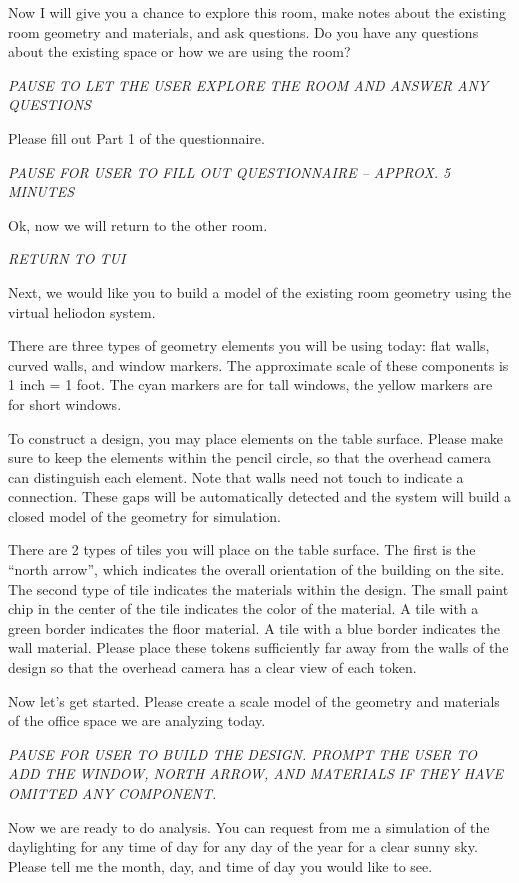 \documentclass[12pt]{article}
\begin{document}
Now I will give you a chance to explore this room, make notes about
the existing room geometry and materials, and ask questions.  Do you
have any questions about the existing space or how we are using the
room?

{\em PAUSE TO LET THE USER EXPLORE THE ROOM AND ANSWER ANY QUESTIONS }

Please fill out Part 1 of the questionnaire.

{\em PAUSE FOR USER TO FILL OUT QUESTIONNAIRE  --  APPROX. 5 MINUTES }

Ok, now we will return to the other room.

{\em RETURN TO TUI }

Next, we would like you to build a model of the existing room
geometry using the virtual heliodon system.  

There are three types of geometry elements you will be using today:
flat walls, curved walls, and window markers.  The approximate scale
of these components is 1 inch = 1 foot.  The cyan markers are for tall
windows, the yellow markers are for short windows.  

To construct a design, you may place elements on the table
surface. Please make sure to keep the elements within the pencil
circle, so that the overhead camera can distinguish each element.
Note that walls need not touch to indicate a connection.  These gaps
will be automatically detected and the system will build a closed
model of the geometry for simulation.

There are 2 types of tiles you will place on the table surface.  The
first is the ``north arrow'', which indicates the overall orientation
of the building on the site.  The second type of tile indicates the
materials within the design.  The small paint chip in the center of
the tile indicates the color of the material.  A tile with a green
border indicates the floor material.  A tile with a blue border
indicates the wall material.  Please place these tokens sufficiently
far away from the walls of the design so that the overhead camera has
a clear view of each token.

Now let's get started.  Please create a scale model of the geometry
and materials of the office space we are analyzing today.

{\em PAUSE FOR USER TO BUILD THE DESIGN.  PROMPT THE USER TO ADD THE
  WINDOW, NORTH ARROW, AND MATERIALS IF THEY HAVE OMITTED ANY
  COMPONENT. }

Now we are ready to do analysis.  You can request from me a simulation
of the daylighting for any time of day for any day of the year for a
clear sunny sky.  Please tell me the month, day, and time of day you
would like to see.
\end{document}
